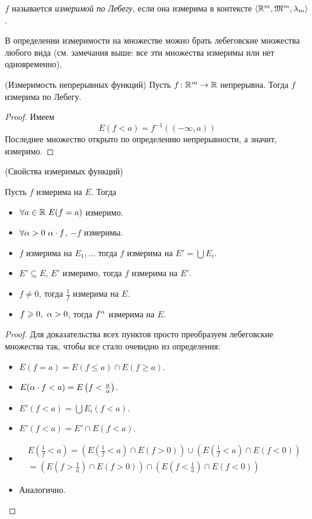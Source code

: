 \begin{definition}
	$f$ называется \textit{измеримой по Лебегу}, если она измерима в 
	контексте $\langle \mathbb{R}^m, \mathfrak{M}^m, \lambda_m \rangle$.
\end{definition}

\begin{remark}
	В определении измеримости на множестве можно брать 
	лебеговские множества любого вида (см. замечания выше:
	все эти множества измеримы или нет одновременно).
\end{remark}

\begin{lemma}(Измеримость непрерывных функций)
	Пусть $f \colon \mathbb{R}^m \to \mathbb{R}$ непрерывна. Тогда $f$ измерима по Лебегу.
\end{lemma}
\begin{proof}
	Имеем
\[
	E(f < a) = f^{-1}((-\infty, a))
\]
	Последнее множество открыто по определению непрерывности, а значит,
	измеримо.
\end{proof}

\begin{theorem}(Свойства измеримых функций)

	Пусть $f$ измерима на $E$. Тогда 
	\begin{itemize}
		\item $\forall a \in \mathbb{R}~ E(f = a)$ измеримо.
		\item $\forall \alpha > 0~ \alpha \cdot f$, $-f$ измеримы.
		\item $f$ измерима на $E_1, \ldots$ тогда $f$ измерима на $E' = \bigcup{E_i}$.
		\item $E' \subseteq E$, $E'$ измеримо, тогда $f$ измерима на $E'$.
		\item $f \neq 0$, тогда $\displaystyle \frac{1}{f}$ измерима на $E$.
		\item $f \geqslant 0,~\alpha > 0$, тогда $f^\alpha$ измерима на $E$.
	\end{itemize}
\end{theorem}
\begin{proof}
	Для доказательства всех пунктов просто преобразуем лебеговские 
	множества так, чтобы все стало очевидно из определения:
	\begin{itemize}
		\item $E(f = a) = E(f \leqslant a) \cap E(f \geqslant a)$.
		\item $E(\alpha \cdot f < a) = E\left(f < \frac{a}{\alpha}\right)$.
		\item $E'(f < a) = \bigcup{E_i(f < a)}$.
		\item $E'(f < a) = E' \cap E(f < a)$.
		\item
\begin{align*}
	E\left(\frac{1}{f} < a\right) = \left(E\left(\frac{1}{f} < a\right) 
	\cap E(f > 0)\right) 									
	\cup \left(E\left(\frac{1}{f} < a\right) \cap E(f < 0)\right) \\
	= \left(E\left(f > \frac{1}{a}\right) \cap E(f > 0)\right) 
	\cap \left(E\left(f < \frac{1}{a}\right) \cap E(f < 0)\right)
\end{align*}
		\item Аналогично.
	\end{itemize}
\end{proof}

